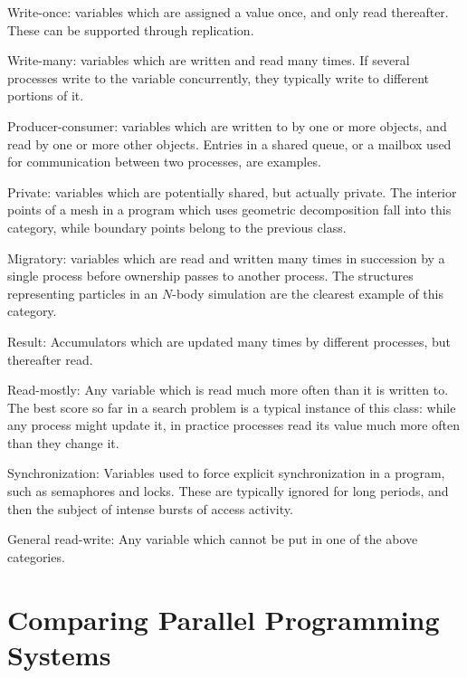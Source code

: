 \begin{small}
\begin{toylist}
\item	Write-once:
	variables which are assigned a value once, and only read thereafter.
	These can be supported through replication.
\item	Write-many:
	variables which are written and read many times.
	If several processes write to the variable concurrently, they typically write to different portions of it.
\item	Producer-consumer:
	variables which are written to by one or more objects, and read by one or more other objects.
	Entries in a shared queue, or a mailbox used for communication between two processes, are examples.
\item	Private:
	variables which are potentially shared, but actually private.
	The interior points of a mesh in a program which uses geometric decomposition fall into this category,
	while boundary points belong to the previous class.
\item	Migratory:
	variables which are read and written many times in succession by a single process before ownership passes to another process.
	The structures representing particles in an $N$-body simulation are the clearest example of this category.
\item	Result:
	Accumulators which are updated many times by different processes, but thereafter read.
\item	Read-mostly:
	Any variable which is read much more often than it is written to.
	The best score so far in a search problem is a typical instance of this class:
	while any process might update it, in practice processes read its value much more often than they change it.
\item	Synchronization:
	Variables used to force explicit synchronization in a program, such as semaphores and locks.
	These are typically ignored for long periods, and then the subject of intense bursts of access activity.
\item	General read-write:
	Any variable which cannot be put in one of the above categories.
\end{toylist}
\end{small}

\newpage
\section{Comparing Parallel Programming Systems\label{s:questions}}

